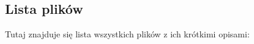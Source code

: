 \subsection{Lista plików}
Tutaj znajduje się lista wszystkich plików z ich krótkimi opisami\-:\begin{DoxyCompactList}
\item{}
\item{}
\end{DoxyCompactList}
